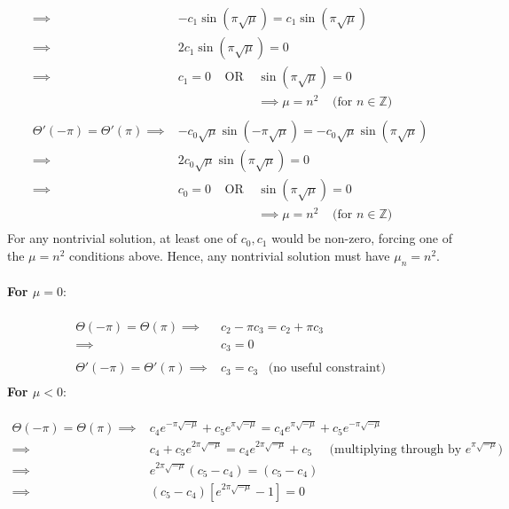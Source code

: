 \documentclass[12pt]{article}
\begin{document}
{\begin{align*}
\implies& -c_1 \sin (\pi \sqrt{\mu}) = c_1 \sin (\pi \sqrt{\mu}) \\
\implies& 2c_1 \sin (\pi \sqrt{\mu}) = 0  \\
\implies& c_1 = 0 \;\;\;\; \text{OR} \;\;\;\; \sin (\pi \sqrt{\mu}) = 0 \\
& \;\;\;\;\;\;\;\;\;\;\;\;\;\;\;\;\;\;\;\;\;\;\; \implies \mu = n^2 \;\;\;\; \text{(for $n \in \mathbb{Z}$)} \\ \\
\Theta'(-\pi) = \Theta'(\pi) \implies& -c_0 \sqrt{\mu} \sin(-\pi \sqrt{\mu}) = -c_0 \sqrt{\mu} \sin(\pi \sqrt{\mu}) \\
\implies& 2c_0 \sqrt{\mu} \sin(\pi \sqrt{\mu}) = 0  \\
\implies& c_0 = 0 \;\;\;\; \text{OR} \;\;\;\; \sin (\pi \sqrt{\mu}) = 0 \\
& \;\;\;\;\;\;\;\;\;\;\;\;\;\;\;\;\;\;\;\;\;\;\; \implies \mu = n^2 \;\;\;\; \text{(for $n \in \mathbb{Z}$)} \\
\end{align*}
For any nontrivial solution, at least one of $c_0, c_1$ would be non-zero, forcing one of the $\mu = n^2$ conditions above. Hence, any nontrivial solution must have $\boxed{\mu_n = n^2}$. \\ \\
\textbf{For $\mu = 0$}:  \\ \\
\begin{align*}
\Theta(-\pi) = \Theta(\pi) \implies& c_2 - \pi c_3 = c_2 + \pi c_3 \\
\implies& \boxed{c_3 = 0} \\ \\
\Theta'(-\pi) = \Theta'(\pi) \implies& c_3 = c_3 \;\;\; \text{(no useful constraint)}  \\
\end{align*}
\textbf{For $\mu < 0$}:  \\ \\
\begin{align*}
\Theta(-\pi) = \Theta(\pi) \implies& c_4 e^{-\pi \sqrt{-\mu}} +c_5 e^{\pi \sqrt{-\mu}} = c_4 e^{\pi \sqrt{-\mu} } +c_5 e^{- \pi\sqrt{-\mu}} \\
\implies& c_4 + c_5 e^{2\pi \sqrt{-\mu}} = c_4 e^{2\pi \sqrt{-\mu} } +c_5 \;\;\;\;\; \text{(multiplying through by $e^{\pi \sqrt{-\mu}}$)} \\ 
\implies& e^{2\pi \sqrt{-\mu}} (c_5 - c_4) = (c_5 - c_4)  \\
\implies& (c_5 - c_4) [ e^{2\pi \sqrt{-\mu}} - 1]  = 0 \\

\end{align*}}
\end{document}
